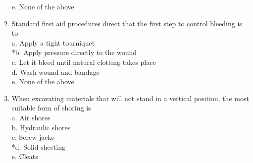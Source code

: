 \begin{enumerate}[1.]
e. None of the above\\
\item Standard first aid procedures direct that the first step to control bleeding is to\\
a. Apply a tight tourniquet\\
*b. Apply pressure directly to the wound\\
c. Let it bleed until natural clotting takes place\\
d. Wash wound and bandage\\
e. None of the above\\
\item When excavating materials that will not stand in a vertical position, the most suitable form of shoring is\\
a. Air shores\\
b. Hydraulic shores\\
c. Screw jacks\\
*d. Solid sheeting\\
e. Cleats\\


\end{enumerate}
